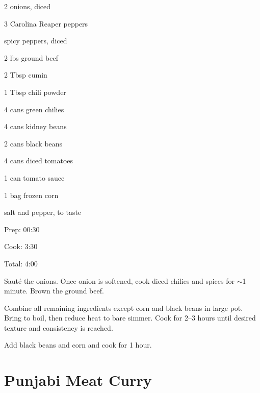 \documentclass[oneside]{book}  %
\def\thisrecipe{}  %
\newcommand{\recipe}[1]{\section{#1}\def\thisrecipe{: #1}} %
\newcommand{\itemNL}{\item[] \hspace{-\labelsep}}  %
\newcommand{\about}{$\sim$}
\begin{document}
\begin{IT}
  \begin{ingredients}
    \item[2] onions, diced
    \item[3] Carolina Reaper peppers
    \itemNL spicy peppers, diced
    \item[2 lbs] ground beef
    \item[2 Tbsp] cumin
    \item[1 Tbsp] chili powder
    \item[4 cans] green chilies
    \item[4 cans] kidney beans
    \item[2 cans] black beans
    \item[4 cans] diced tomatoes
    \item[1 can] tomato sauce
    \item[1 bag] frozen corn
    \itemNL salt and pepper, to taste
  \end{ingredients}

  \switchcolumn

  \begin{timeline}
    \item[Prep:]  00:30
    \item[Cook:]  3:30
    \item[Total:] 4:00
  \end{timeline}
\end{IT}

\begin{directions}
  \item Saut\'e the onions. Once onion is softened, cook diced chilies and
    spices for \about 1 minute. Brown the ground beef.

  \item Combine all remaining ingredients except corn and black beans in large
    pot. Bring to boil, then reduce heat to bare simmer. Cook for 2--3 hours
    until desired texture and consistency is reached.

  \item Add black beans and corn and cook for 1 hour.
\end{directions}
\recipe{Punjabi Meat Curry} \label{recipe:punjabi_meat_curry} %
\end{document}
